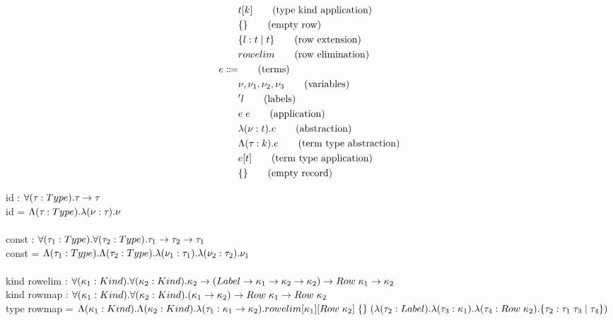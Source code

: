 \documentclass[12pt]{article}
\newcommand\llabel[0]{l} %
\newcommand\skind[0]{\mathnormal{Kind}} %
\newcommand\kind[0]{k} %
\newcommand\kvar[1]{\kappa_{#1}} %
\newcommand\ktype[0]{\mathnormal{Type}} %
\newcommand\krow[0]{\mathnormal{Row}} %
\newcommand\klabel[0]{\mathnormal{Label}} %
\newcommand\karr[2]{#1 \rightarrow #2} %
\newcommand\kapp[2]{#1 \; #2} %
\newcommand\kforall[3]{\forall(#1 : #2) . #3} %
\newcommand\type[0]{t} %
\newcommand\tvar[1]{\tau_{#1}} %
\newcommand\tarr[2]{#1 \rightarrow #2} %
\newcommand\tapp[2]{#1 \; #2} %
\newcommand\tabs[3]{\lambda(#1 : #2) . #3} %
\newcommand\tforall[3]{\forall(#1 : #2) . #3} %
\newcommand\tkabs[3]{\Lambda(#1 : #2) . #3} %
\newcommand\tkapp[2]{#1 [ #2 ]} %
\newcommand\trowempty[0]{\{\}} %
\newcommand\trowextend[3]{\{ #1 : #2 \; | \; #3 \}} %
\newcommand\trowelim[0]{\mathnormal{rowelim}} %
\newcommand\term[0]{e} %
\newcommand\evar[1]{\nu_{#1}} %
\newcommand\elabel[1]{'#1} %
\newcommand\eapp[2]{#1 \; #2} %
\newcommand\eabs[3]{\lambda(#1 : #2) . #3} %
\newcommand\etabs[3]{\Lambda(#1 : #2) . #3} %
\newcommand\etapp[2]{#1 [ #2 ]} %
\newcommand\eempty[0]{\{\}} %
\begin{document}
\begin{align}
				& \tkapp{\type}{\kind}				\tag{type kind application} \\
				& \trowempty					\tag{empty row} \\
				& \trowextend{\llabel}{\type}{\type} 		\tag{row extension} \\
				& \trowelim				 		\tag{row elimination} \\
	\term \Coloneqq	&							\tag{terms} \\
				& \evar{}, \evar{1}, \evar{2}, \evar{3}	\tag{variables} \\
				& \elabel{\llabel}					\tag{labels} \\
				& \eapp{\term}{\term}				\tag{application} \\
				& \eabs{\evar{}}{\type}{\term}			\tag{abstraction} \\
				& \etabs{\tvar{}}{\kind}{\term}			\tag{term type abstraction} \\
				& \etapp{\term}{\type}				\tag{term type application} \\
				& \eempty						\tag{empty record} \\
\end{align}

\noindent
id : $\tforall{\tvar{}}{\ktype}{\tarr{\tvar{}}{\tvar{}}}$ \\
id = $\etabs{\tvar{}}{\ktype}{\eabs{\evar{}}{\tvar{}}{\evar{}}}$ \\
\\
const : $\tforall{\tvar{1}}{\ktype}{\tforall{\tvar{2}}{\ktype}{\tarr{\tvar{1}}{\tarr{\tvar{2}}{\tvar{1}}}}}$ \\
const = $\etabs{\tvar{1}}{\ktype}{\etabs{\tvar{2}}{\ktype}{\eabs{\evar{1}}{\tvar{1}}{\eabs{\evar{2}}{\tvar{2}}{\evar{1}}}}}$ \\
\\
kind rowelim : $\kforall{\kvar{1}}{\skind}{\kforall{\kvar{2}}{\skind}{\karr{\kvar{2}}{\karr{(    \karr{\klabel}{\karr{\kvar{1}}{\karr{\kvar{2}}{\kvar{2}}}}      )}{\karr{\kapp{\krow}{\kvar{1}}}{\kvar{2}}}}}}$ \\
kind rowmap : $\kforall{\kvar{1}}{\skind}{ \kforall{\kvar{2}}{\skind}{\karr{(\karr{\kvar{1}}{\kvar{2}})}{\karr{\kapp{\krow}{\kvar{1}}}{\kapp{\krow}{\kvar{2}}}}} }$ \\
type rowmap = 
$\tkabs{\kvar{1}}{\skind}
{\tkabs{\kvar{2}}{\skind}
{\tabs{\tvar{1}}{\karr{\kvar{1}}{\kvar{2}}}\\{\tapp{\tapp{\tkapp{\tkapp{\trowelim}{\kvar{1}}}{\kapp{\krow}{\kvar{2}}}}{\trowempty}}{  (\tabs{\tvar{2}}{\klabel}{\tabs{\tvar{3}}{\kvar{1}}{\tabs{\tvar{4}}{    \kapp{\krow}{\kvar{2}}    }{    \trowextend{\tvar{2}}{\tapp{\tvar{1}}{\tvar{3}}}{\tvar{4}}     }}})  }}}}     $ \\
\\
\end{document}
